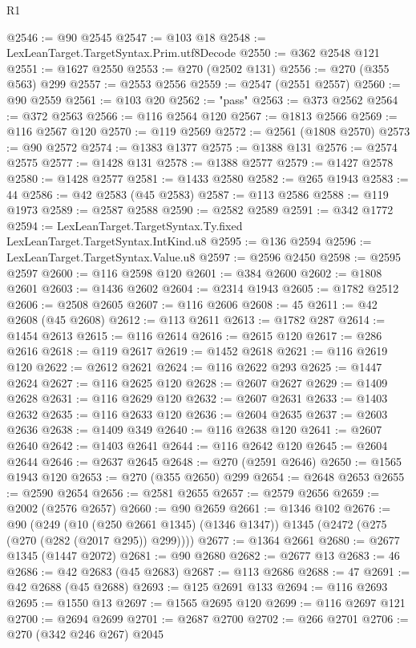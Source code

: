 \begin{lexlean}{R1}
\begin{coremodule}
@2546 := @90 @2545
@2547 := @103 @18
@2548 := LexLeanTarget.TargetSyntax.Prim.utf8Decode
@2550 := @362 @2548 @121
@2551 := @1627 @2550
@2553 := @270 (@2502 @131)
@2556 := @270 (@355 @563) @299
@2557 := @2553 @2556
@2559 := @2547 (@2551 @2557)
@2560 := @90 @2559
@2561 := @103 @20
@2562 := "pass"
@2563 := @373 @2562
@2564 := @372 @2563
@2566 := @116 @2564 @120
@2567 := @1813 @2566
@2569 := @116 @2567 @120
@2570 := @119 @2569
@2572 := @2561 (@1808 @2570)
@2573 := @90 @2572
@2574 := @1383 @1377
@2575 := @1388 @131
@2576 := @2574 @2575
@2577 := @1428 @131
@2578 := @1388 @2577
@2579 := @1427 @2578
@2580 := @1428 @2577
@2581 := @1433 @2580
@2582 := @265 @1943
@2583 := 44
@2586 := @42 @2583 (@45 @2583)
@2587 := @113 @2586
@2588 := @119 @1973
@2589 := @2587 @2588
@2590 := @2582 @2589
@2591 := @342 @1772
@2594 := LexLeanTarget.TargetSyntax.Ty.fixed LexLeanTarget.TargetSyntax.IntKind.u8
@2595 := @136 @2594
@2596 := LexLeanTarget.TargetSyntax.Value.u8
@2597 := @2596 @2450
@2598 := @2595 @2597
@2600 := @116 @2598 @120
@2601 := @384 @2600
@2602 := @1808 @2601
@2603 := @1436 @2602
@2604 := @2314 @1943
@2605 := @1782 @2512
@2606 := @2508 @2605
@2607 := @116 @2606
@2608 := 45
@2611 := @42 @2608 (@45 @2608)
@2612 := @113 @2611
@2613 := @1782 @287
@2614 := @1454 @2613
@2615 := @116 @2614
@2616 := @2615 @120
@2617 := @286 @2616
@2618 := @119 @2617
@2619 := @1452 @2618
@2621 := @116 @2619 @120
@2622 := @2612 @2621
@2624 := @116 @2622 @293
@2625 := @1447 @2624
@2627 := @116 @2625 @120
@2628 := @2607 @2627
@2629 := @1409 @2628
@2631 := @116 @2629 @120
@2632 := @2607 @2631
@2633 := @1403 @2632
@2635 := @116 @2633 @120
@2636 := @2604 @2635
@2637 := @2603 @2636
@2638 := @1409 @349
@2640 := @116 @2638 @120
@2641 := @2607 @2640
@2642 := @1403 @2641
@2644 := @116 @2642 @120
@2645 := @2604 @2644
@2646 := @2637 @2645
@2648 := @270 (@2591 @2646)
@2650 := @1565 @1943 @120
@2653 := @270 (@355 @2650) @299
@2654 := @2648 @2653
@2655 := @2590 @2654
@2656 := @2581 @2655
@2657 := @2579 @2656
@2659 := @2002 (@2576 @2657)
@2660 := @90 @2659
@2661 := @1346 @102
@2676 := @90
    (@249
      (@10 (@250 @2661 @1345) (@1346 @1347))
      @1345
      (@2472 (@275 (@270 (@282 (@2017 @295)) @299))))
@2677 := @1364 @2661
@2680 := @2677 @1345 (@1447 @2072)
@2681 := @90 @2680
@2682 := @2677 @13
@2683 := 46
@2686 := @42 @2683 (@45 @2683)
@2687 := @113 @2686
@2688 := 47
@2691 := @42 @2688 (@45 @2688)
@2693 := @125 @2691 @133
@2694 := @116 @2693
@2695 := @1550 @13
@2697 := @1565 @2695 @120
@2699 := @116 @2697 @121
@2700 := @2694 @2699
@2701 := @2687 @2700
@2702 := @266 @2701
@2706 := @270 (@342 @246 @267) @2045

\end{coremodule}
\end{lexlean}
